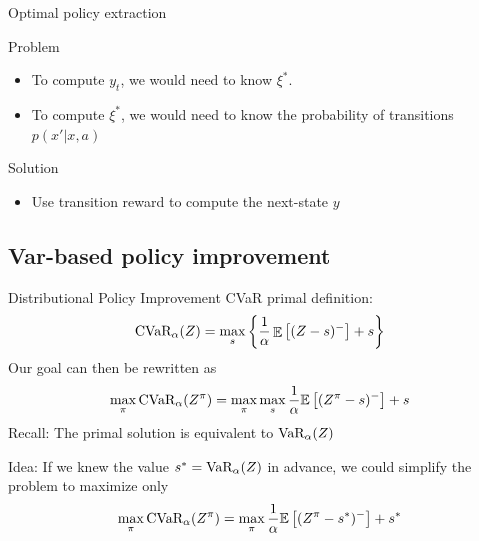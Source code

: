 \documentclass{beamer}
\begin{document}
\begin{frame}{Optimal policy extraction}


\begin{alertblock}{Problem}
\begin{itemize}
\item To compute $y_t$, we would need to know $\xi^*$.
\item To compute $\xi^*$, we would need to know the probability of transitions $p(x'|x, a)$
\end{itemize}
\end{alertblock}

\bigskip
\begin{exampleblock}{Solution}
\begin{itemize}
\item Use transition reward to compute the next-state $y$
\end{itemize}
\end{exampleblock}
\end{frame}

\subsection{Var-based policy improvement}

\begin{frame}{Distributional Policy Improvement}
CVaR primal definition:
\begin{equation*}
\text{CVaR}_\alpha(Z)=\max_s\left\lbrace \dfrac{1}{\alpha}\mathop{\mathbb{E}}\left[ (Z-s)^-\right] + s  \right\rbrace 
\end{equation*}
Our goal can then be rewritten as
\begin{equation*}
\max_\pi \text{CVaR}_\alpha(Z^\pi) = \max_\pi \max_s \dfrac{1}{\alpha}\mathbb{E}
\left[ (Z^\pi-s)^-\right] + s
\end{equation*}
Recall: The primal solution is equivalent to $\text{VaR}_\alpha(Z)$

Idea: If we knew the value $s^*=\text{VaR}_\alpha(Z)$ in advance, we could simplify the problem to maximize only
$$
\max_\pi \text{CVaR}_\alpha(Z^\pi) = \max_\pi \dfrac{1}{\alpha}\mathbb{E}\left[ (Z^\pi-s^*)^-\right] + s^*
$$
\end{frame}
\end{document}

